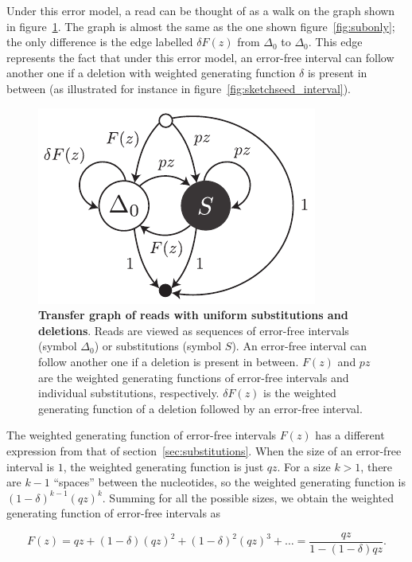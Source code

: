 \documentclass{article}
\begin{document}
Under this error model, a read can be thought of as a walk on the graph
shown in figure~\ref{fig:deletions}. The graph is almost the same as the
one shown figure~\ref{fig:subonly}; the only difference is the edge
labelled $\delta F(z)$ from $\Delta_0$ to $\Delta_0$. This edge represents
the fact that under this error model, an error-free interval can follow
another one if a deletion with weighted generating function $\delta$ is
present in between (as illustrated for instance in
figure~\ref{fig:sketchseed_interval}).

\begin{figure}[h]
\centering
\includegraphics[scale=0.9]{deletions.pdf}
\caption{\textbf{Transfer graph of reads with uniform substitutions and
deletions}. Reads are viewed as sequences of error-free intervals (symbol
$\Delta_0$) or substitutions (symbol $S$). An error-free interval can
follow another one if a deletion is present in between. $F(z)$ and $pz$
are the weighted generating functions of error-free intervals and
individual substitutions, respectively. $\delta F(z)$ is the weighted
generating function of a deletion followed by an error-free interval.}
\label{fig:deletions}
\end{figure}

The weighted generating function of error-free intervals $F(z)$ has a
different expression from that of section~\ref{sec:substitutions}. When
the size of an error-free interval is $1$, the weighted generating
function is just $qz$. For a size $k > 1$, there are $k-1$ ``spaces''
between the nucleotides, so the weighted generating function is
$(1-\delta)^{k-1}(qz)^k$. Summing for all the possible sizes, we obtain
the weighted generating function of error-free intervals as

\begin{equation}
\label{eq:Fdel}
F(z) = qz + (1-\delta)(qz)^2 + (1-\delta)^2(qz)^3 + \ldots =
\frac{qz}{1-(1-\delta)qz}.
\end{equation}
\end{document}
